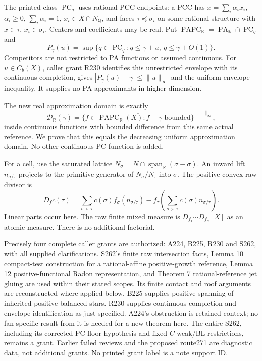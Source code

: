 \documentclass[11pt]{article}
\newcommand{\R}{\mathbb R}
\newcommand{\Q}{\mathbb Q}
\newcommand{\PA}{\operatorname{PA}}
\newcommand{\PC}{\operatorname{PC}}
\newcommand{\PAPC}{\operatorname{PAPC}}
\begin{document}
The printed class $\PC_q$ uses rational PCC endpoints: a PCC has
$x=\sum_i\alpha_i x_i$, $\alpha_i\geq0$, $\sum_i\alpha_i=1$,
$x_i\in X\cap N_\Q$, and faces $\tau\preceq\sigma_i$ on some
rational structure with $x\in\tau$, $x_i\in\sigma_i$. Centers and
coefficients may be real. Put $\PAPC_\R=\PA_\R\cap\PC_q$ and
\begin{equation}\label{envelope}
 P_\gamma(u)=\sup\{q\in\PC_q:q\leq\gamma+u,\ q\leq\gamma+O(1)\}.
\end{equation}
Competitors are not restricted to PA functions or assumed continuous.
For $u\in C_b(X)$, caller grant R230 identifies this unrestricted
envelope with its continuous completion, gives
$|P_\gamma(u)-\gamma|\leq\|u\|_\infty$ and the uniform envelope
inequality. It supplies no PA approximants in higher dimension.

The new real approximation domain is exactly
\[
 \mathcal D_\R(\gamma)=\overline{\{f\in\PAPC_\R(X):f-\gamma
                   \text{ bounded}\}}^{\,\|\cdot\|_\infty},
\]
inside continuous functions with bounded difference from this same
actual reference. We prove that this equals the decreasing uniform
approximation domain. No other continuous PC function is added.

For a cell, use the saturated lattice
$N_\sigma=N\cap\operatorname{span}_\R(\sigma-\sigma)$. An inward lift
$n_{\sigma/\tau}$ projects to the primitive generator of
$N_\sigma/N_\tau$ into $\sigma$. The positive convex raw divisor is
\begin{equation}\label{divisor}
 D_f c(\tau)=\sum_{\sigma\succ\tau}c(\sigma)f_\sigma(n_{\sigma/\tau})
 -f_\tau\left(\sum_{\sigma\succ\tau}c(\sigma)n_{\sigma/\tau}\right).
\end{equation}
Linear parts occur here. The raw finite mixed measure is $D_{f_1}
\cdots D_{f_d}[X]$ as an atomic measure. There is no additional factorial.

Precisely four complete caller grants are authorized: A224, B225,
R230 and S262, with all supplied clarifications. S262's finite raw
intersection facts, Lemma 10 compact-test construction for a
rational-affine positive-growth reference, Lemma 12 positive-functional
Radon representation, and Theorem 7 rational-reference jet gluing are
used within their stated scopes. Its finite contact and roof arguments
are reconstructed where applied below. B225 supplies positive spanning
of inherited positive balanced stars. R230 supplies continuous
completion and envelope identification as just specified. A224's
obstruction is retained context; no fan-specific result from it is
needed for a new theorem here. The entire S262, including its corrected
PC floor hypothesis and fixed-$C$ weak/BL restrictions, remains a grant.
Earlier failed reviews and the proposed route271 are diagnostic data,
not additional grants. No printed grant label is a note support ID.
\end{document}
